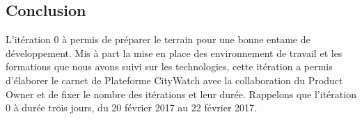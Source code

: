\subsection{Conclusion}

L'itération 0 à permis de préparer le terrain pour une bonne entame de
développement. Mis à part la mise en place des environnement de travail et les
formations que nous avons suivi sur les technologies, cette itération a permis
d'élaborer le carnet de Plateforme CityWatch avec la collaboration du Product
Owner et de fixer le nombre des itérations et leur durée. Rappelons que
l'itération 0 à durée trois jours, du 20 février 2017 au 22 février 2017.
